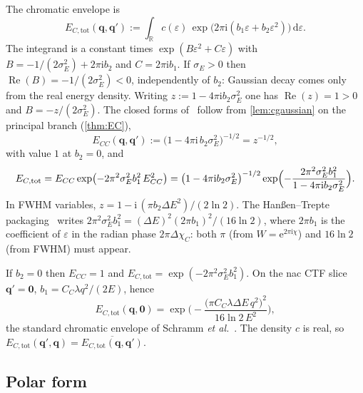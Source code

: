 \documentclass[11pt,a4paper]{article}
\theoremstyle{definition}
\theoremstyle{remark}
\DeclareMathOperator{\ReOp}{Re}
\newcommand{\R}{\mathbb{R}}
\newcommand{\dd}{\mathrm{d}}
\newcommand{\ee}{\mathrm{e}}
\newcommand{\ii}{\mathrm{i}}
\newcommand{\conj}[1]{\overline{#1}}
\newcommand{\sE}{\sigma_E}
\newcommand{\DE}{\Delta E}
\newcommand{\ECtot}{E_{C,\mathrm{tot}}}
\newcommand{\ECC}{E_{CC}}
\begin{document}
The chromatic envelope is
\begin{equation}
\label{eq:ECint}
\ECtot(\mathbf{q},\mathbf{q}')
:=\int_{\R}
c(\varepsilon)\,
\exp\bigl(2\pi\ii(b_1\varepsilon+b_2\varepsilon^2)\bigr)
\,\dd\varepsilon.
\end{equation}
The integrand is a constant times $\exp(B\varepsilon^2+C\varepsilon)$
with $B=-1/(2\sE^2)+2\pi\ii b_2$ and $C=2\pi\ii b_1$.
If $\sE>0$ then $\ReOp(B)=-1/(2\sE^2)<0$, independently of $b_2$:
Gaussian decay comes only from the real energy density.
Writing $z:=1-4\pi\ii b_2\sE^2$ one has $\ReOp(z)=1>0$ and
$B=-z/(2\sE^2)$.
The closed forms of~\cite[Eqs.~(6a)--(6b)]{Yu2019} follow from
\cref{lem:cgaussian} on the principal branch (\cref{thm:EC}),
\begin{equation}
\label{eq:paper6b}
\ECC(\mathbf{q},\mathbf{q}')
:=\bigl(1-4\pi\ii\,b_2\sE^2\bigr)^{-1/2}
=z^{-1/2},
\end{equation}
with value $1$ at $b_2=0$, and
\begin{equation}
\label{eq:paper6a}
\ECtot
=\ECC\exp\bigl(-2\pi^2\sE^2 b_1^2\,\ECC^2\bigr)
=\bigl(1-4\pi\ii b_2\sE^2\bigr)^{-1/2}
\exp\Bigl(
-\frac{2\pi^2\sE^2 b_1^2}{1-4\pi\ii b_2\sE^2}
\Bigr).
\end{equation}
In FWHM variables,
$z=1-\ii\,(\pi b_2\DE^2)/(2\ln 2)$.
The Han{\ss}en--Trepte packaging~\cite{Hanen1971} writes
$2\pi^2\sE^2 b_1^2=(\DE)^2(2\pi b_1)^2/(16\ln 2)$, where $2\pi b_1$
is the coefficient of $\varepsilon$ in the radian phase
$2\pi\Delta\chi_C$: both $\pi$ (from $W=\ee^{2\pi\ii\chi}$) and
$16\ln 2$ (from FWHM) must appear.

If $b_2=0$ then $\ECC=1$ and $\ECtot=\exp(-2\pi^2\sE^2 b_1^2)$.
On the nac CTF slice $\mathbf{q}'=\mathbf{0}$,
$b_1=C_C\lambda q^2/(2E)$, hence
\begin{equation}
\label{eq:nac-ctf}
\ECtot(\mathbf{q},\mathbf{0})
=\exp\Biggl(
-\frac{\bigl(\pi C_C\lambda\DE\,q^2\bigr)^2}{16\ln 2\,E^2}
\Biggr),
\end{equation}
the standard chromatic envelope of Schramm \emph{et al.}~\cite{Schramm2012}.
The density $c$ is real, so
$\ECtot(\mathbf{q}',\mathbf{q})=\conj{\ECtot(\mathbf{q},\mathbf{q}')}$.

\subsection{Polar form}
\label{sec:polar}
\end{document}
